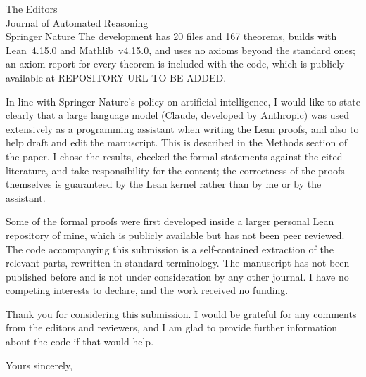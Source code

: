 \documentclass[11pt]{letter}
\begin{document}
\begin{letter}{The Editors\\Journal of Automated Reasoning\\Springer Nature}
The development has 20 files and 167 theorems, builds with Lean~4.15.0 and Mathlib~v4.15.0, and uses no axioms beyond the standard ones; an axiom report for every theorem is included with the code, which is publicly available at REPOSITORY-URL-TO-BE-ADDED.

In line with Springer Nature's policy on artificial intelligence, I would like to state clearly that a large language model (Claude, developed by Anthropic) was used extensively as a programming assistant when writing the Lean proofs, and also to help draft and edit the manuscript. This is described in the Methods section of the paper. I chose the results, checked the formal statements against the cited literature, and take responsibility for the content; the correctness of the proofs themselves is guaranteed by the Lean kernel rather than by me or by the assistant.

Some of the formal proofs were first developed inside a larger personal Lean repository of mine, which is publicly available but has not been peer reviewed. The code accompanying this submission is a self-contained extraction of the relevant parts, rewritten in standard terminology. The manuscript has not been published before and is not under consideration by any other journal. I have no competing interests to declare, and the work received no funding.

Thank you for considering this submission. I would be grateful for any comments from the editors and reviewers, and I am glad to provide further information about the code if that would help.

\closing{Yours sincerely,}

\end{letter}
\end{document}
